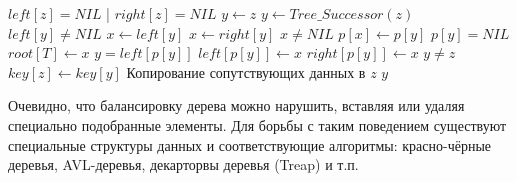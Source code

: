 \documentclass[11pt]{article}
\begin{document}
\begin{codebox}
\li \If $left[z] = NIL$ | $right[z] = NIL$
\li   \Then $y \gets z$
\li   \Else $y \gets Tree\_Successor(z)$
  \End
\li \If $left[y] \neq NIL$
\li   \Then $x \gets left[y]$
\li   \Else $x \gets right[y]$
  \End
\li \If $x \neq NIL$
\li   \Then $p[x] \gets p[y]$
  \End
\li \If $p[y] = NIL$
\li   \Then $root[T] \gets x$
\li   \Else \If $y = left[p[y]]$
\li         \Then $left[p[y]] \gets x$
\li         \Else $right[p[y]] \gets x$
  \End
\End
\li \If $y \neq z$
\li   \Then $key[z] \gets key[y]$
\li   \Comment Копирование сопутствующих данных в $z$
  \End
\li \Return $y$
\End
\end{codebox}

Очевидно, что балансировку дерева можно нарушить, вставляя или удаляя специально
подобранные элементы. Для борьбы с таким поведением существуют специальные
структуры данных и соответствующие алгоритмы: красно-чёрные деревья, AVL-деревья,
декарторвы деревья (Treap) и т.п.
\end{document}
